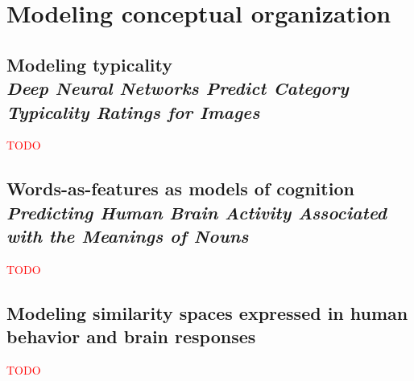 \chapter{Modeling conceptual organization}
\label{chap:modeling_conceptual_organization}

\section[Modeling typicality]{Modeling typicality\\ \large{\textit{Deep Neural Networks Predict Category Typicality Ratings for Images}\\ \cite{lake-2015-deep}}}
\textcolor{red}{TODO}

\section[Words-as-features as models of cognition]{Words-as-features as models of cognition\\ \large{\textit{Predicting Human Brain Activity Associated with the Meanings of Nouns}\\ \cite{Mitchell2008PredictingHB}}}
\textcolor{red}{TODO}

\section{Modeling similarity spaces expressed in human behavior and brain responses}
\textcolor{red}{TODO}
